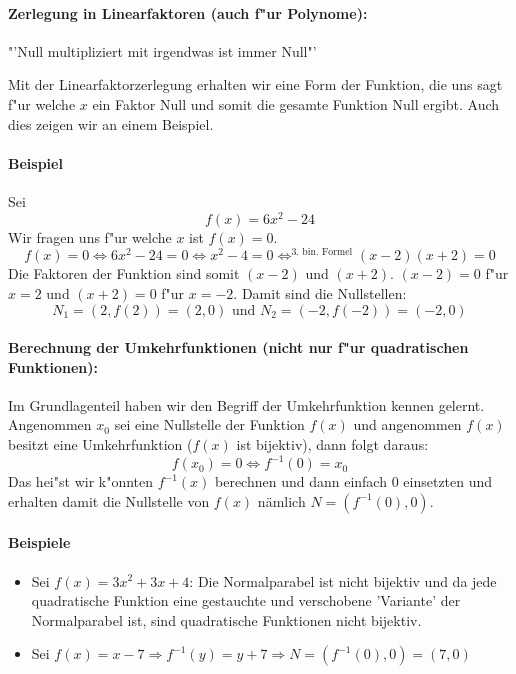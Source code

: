 \paragraph{Zerlegung in Linearfaktoren (auch f"ur Polynome):}
\begin{center}
"'Null multipliziert mit irgendwas ist immer Null"'
\end{center}
Mit der Linearfaktorzerlegung erhalten wir eine Form der Funktion, die uns sagt f"ur welche $x$ ein Faktor Null und somit die gesamte Funktion Null ergibt. Auch dies zeigen wir an einem Beispiel.

\paragraph{Beispiel}
Sei
\begin{equation*}
f(x) = 6x^2 - 24
\end{equation*}
Wir fragen uns f"ur welche $x$ ist $f(x) = 0$.
\begin{equation*}
f(x) = 0 \iff 6x^2 - 24 = 0 \iff x^2 - 4 = 0 \iff^{\text{3. bin. Formel}} (x-2)(x+2) = 0 
\end{equation*}
Die Faktoren der Funktion sind somit $(x-2)$ und $(x+2)$. $(x-2) = 0$ f"ur $x = 2$ und $(x+2) = 0$ f"ur  $x = -2$. Damit sind die Nullstellen:
\begin{equation*}
N_1 = (2, f(2)) = (2, 0) \text{ und } N_2 = (-2, f(-2)) = (-2, 0)
\end{equation*}

\paragraph{Berechnung der Umkehrfunktionen (nicht nur f"ur quadratischen Funktionen):}
Im Grundlagenteil haben wir den Begriff der Umkehrfunktion kennen gelernt. Angenommen $x_0$ sei eine Nullstelle der Funktion $f(x)$ und angenommen $f(x)$ besitzt eine Umkehrfunktion ($f(x)$ ist bijektiv), dann folgt daraus:
\begin{equation*}
f(x_0) = 0 \iff f^{-1}(0) = x_0
\end{equation*}
Das hei"st wir k"onnten $f^{-1}(x)$ berechnen und dann einfach $0$ einsetzten und erhalten damit die Nullstelle von $f(x)$ nämlich $N = (f^{-1}(0), 0)$.

\paragraph{Beispiele}
\begin{itemize}
\item Sei $f(x) = 3x^2 + 3x + 4$: Die Normalparabel ist nicht bijektiv und da jede quadratische Funktion eine gestauchte und verschobene 'Variante' der Normalparabel ist, sind quadratische Funktionen nicht bijektiv.
\item Sei $f(x) = x - 7 \Rightarrow f^{-1}(y) = y + 7 \Rightarrow N = (f^{-1}(0), 0) = (7, 0)$
\end{itemize}

